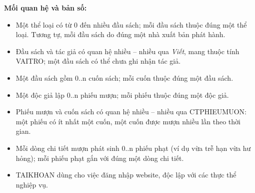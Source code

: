 \documentclass[13pt,a4paper,oneside]{extreport}
\begin{document}
\textbf{Mối quan hệ và bản số:}
\begin{itemize}
\item Một thể loại có từ 0 đến nhiều đầu sách; mỗi đầu sách thuộc đúng một thể loại. Tương tự, mỗi đầu sách do đúng một nhà xuất bản phát hành.
\item Đầu sách và tác giả có quan hệ nhiều -- nhiều qua \textit{Viết}, mang thuộc tính VAITRO; một đầu sách có thể chưa ghi nhận tác giả.
\item Một đầu sách gồm 0..n cuốn sách; mỗi cuốn thuộc đúng một đầu sách.
\item Một độc giả lập 0..n phiếu mượn; mỗi phiếu thuộc đúng một độc giả.
\item Phiếu mượn và cuốn sách có quan hệ nhiều -- nhiều qua CTPHIEUMUON: một phiếu có ít nhất một cuốn, một cuốn được mượn nhiều lần theo thời gian.
\item Mỗi dòng chi tiết mượn phát sinh 0..n phiếu phạt (ví dụ vừa trễ hạn vừa hư hỏng); mỗi phiếu phạt gắn với đúng một dòng chi tiết.
\item TAIKHOAN dùng cho việc đăng nhập website, độc lập với các thực thể nghiệp vụ.
\end{itemize}
\end{document}
